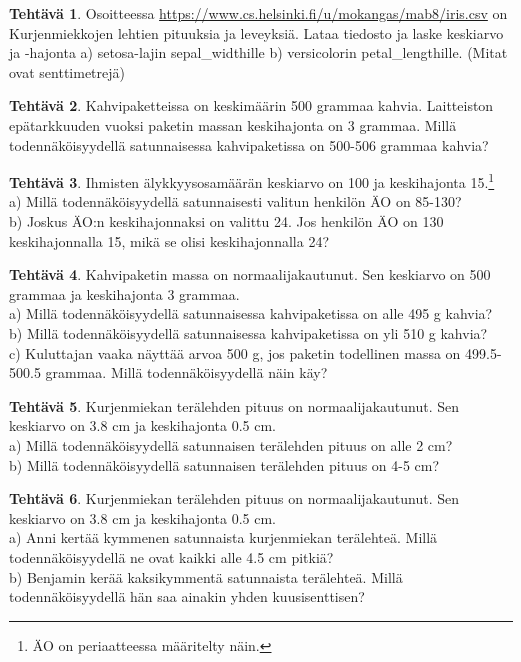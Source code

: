 \documentclass[12pt,leqno,a4paper,oneside]{amsart}
\theoremstyle{definition}
\newtheorem{exercise}{Tehtävä}
\theoremstyle{remark}
\numberwithin{equation}{section}
\begin{document}
\begin{exercise}
 Osoitteessa \url{https://www.cs.helsinki.fi/u/mokangas/mab8/iris.csv} on Kurjenmiekkojen lehtien pituuksia ja leveyksiä.
 Lataa tiedosto ja laske keskiarvo ja -hajonta a) setosa-lajin sepal\_widthille b) versicolorin petal\_lengthille. (Mitat ovat senttimetrejä)
\end{exercise}



\begin{exercise}
Kahvipaketteissa on keskimäärin 500 grammaa kahvia. Laitteiston epätarkkuuden vuoksi paketin massan keskihajonta on 3 grammaa.
Millä todennäköisyydellä satunnaisessa kahvipaketissa on 500-506 grammaa kahvia?
\end{exercise}

\begin{exercise}
 Ihmisten älykkyysosamäärän keskiarvo on 100 ja keskihajonta 15.\footnote{ÄO on periaatteessa määritelty näin.}\\
 a) Millä todennäköisyydellä satunnaisesti valitun henkilön ÄO on 85-130?\\
 b) Joskus ÄO:n keskihajonnaksi on valittu 24. Jos henkilön ÄO on 130 keskihajonnalla 15, mikä se olisi keskihajonnalla 24?
\end{exercise}


 
\begin{exercise}
 Kahvipaketin massa on normaalijakautunut. Sen keskiarvo on 500 grammaa ja keskihajonta 3 grammaa.\\
 a) Millä todennäköisyydellä satunnaisessa kahvipaketissa on alle 495 g kahvia?\\
 b) Millä todennäköisyydellä satunnaisessa kahvipaketissa on yli 510 g kahvia?\\
 c) Kuluttajan vaaka näyttää arvoa 500 g, jos paketin todellinen massa on 499.5-500.5 grammaa. Millä todennäköisyydellä näin käy?
\end{exercise}

\begin{exercise}
 Kurjenmiekan terälehden pituus on normaalijakautunut. Sen keskiarvo on 3.8 cm ja keskihajonta 0.5 cm. \\
 a) Millä todennäköisyydellä satunnaisen terälehden pituus on alle 2 cm?\\
 b) Millä todennäköisyydellä satunnaisen terälehden pituus on 4-5 cm?
\end{exercise}

\begin{exercise}
 Kurjenmiekan terälehden pituus on normaalijakautunut. Sen keskiarvo on 3.8 cm ja keskihajonta 0.5 cm. \\
 a) Anni kertää kymmenen satunnaista kurjenmiekan terälehteä. Millä todennäköisyydellä ne ovat kaikki alle 4.5 cm pitkiä?\\
 b) Benjamin kerää kaksikymmentä satunnaista terälehteä. Millä todennäköisyydellä hän saa ainakin yhden kuusisenttisen?
\end{exercise}
\end{document}
